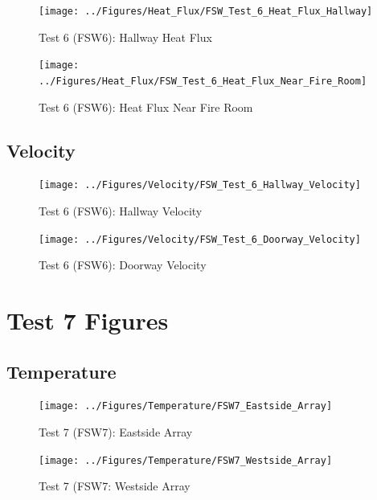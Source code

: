 \documentclass[12pt,oneside]{book}
\begin{document}
\begin{figure}[!ht]
	\texttt{[image: ../Figures/Heat\_Flux/FSW\_Test\_6\_Heat\_Flux\_Hallway]}
	\caption{Test 6 (FSW6): Hallway Heat Flux}
	\label{fig:Test_6_Hallway_Heat_Flux}
\end{figure}

\begin{figure}[!ht]
	\texttt{[image: ../Figures/Heat\_Flux/FSW\_Test\_6\_Heat\_Flux\_Near\_Fire\_Room]}
	\caption{Test 6 (FSW6): Heat Flux Near Fire Room}
	\label{fig:Test_6_Heat_Flux_Near_Fire_Room}
\end{figure}

\subsection{Velocity}
\label{subsec:Velocity}

\begin{figure}[!ht]
	\texttt{[image: ../Figures/Velocity/FSW\_Test\_6\_Hallway\_Velocity]}
	\caption{Test 6 (FSW6): Hallway Velocity}
	\label{fig:Test_6_Hallway_Velocity}
\end{figure}

\begin{figure}[!ht]
	\texttt{[image: ../Figures/Velocity/FSW\_Test\_6\_Doorway\_Velocity]}
	\caption{Test 6 (FSW6): Doorway Velocity}
	\label{fig:Test_6_Doorway_Velocity}
\end{figure}

\clearpage

\section{Test 7 Figures}
\label{subsec:Test_7_Figures}

\subsection{Temperature}
\label{subsec:Temperature}

\begin{figure}[!ht]
	\texttt{[image: ../Figures/Temperature/FSW7\_Eastside\_Array]}
	\caption{Test 7 (FSW7): Eastside Array}
	\label{fig:Test_7_Eastside_Array}
\end{figure}

\begin{figure}[!ht]
	\texttt{[image: ../Figures/Temperature/FSW7\_Westside\_Array]}
	\caption{Test 7 (FSW7: Westside Array}
	\label{fig:Test_7_Westside_Array}
\end{figure}
\end{document}
